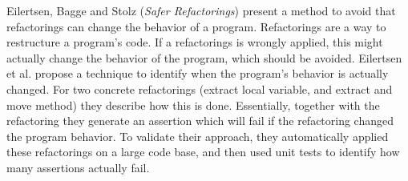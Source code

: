 

Eilertsen, Bagge and Stolz
\cite{isola-2016-eilertsen}
({\em Safer Refactorings})
present a method to avoid that refactorings can change the behavior
of a program. 
Refactorings are a way to restructure a program's code. If a
refactorings is wrongly applied, this might actually change the
behavior of the program, which should be avoided. Eilertsen et al. propose a technique to identify when the program's behavior is actually changed. For two concrete refactorings (extract local variable, and extract and move method) they describe how this is done. Essentially, together with the refactoring they generate an assertion which will fail if the refactoring changed the program behavior. To validate their approach, they automatically applied these refactorings on a large code base, and then used unit tests to identify how many assertions actually fail.
